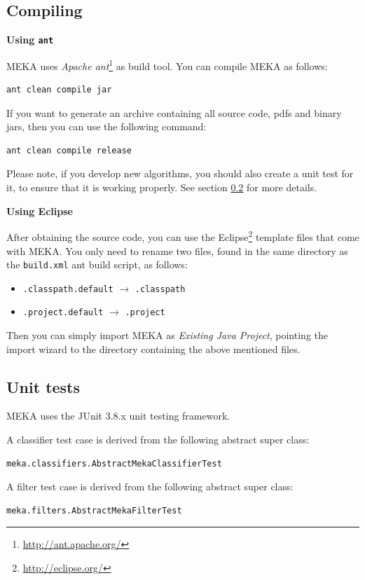 \documentclass[11pt]{article}
\newcommand{\heading}[1]{
    \vspace{0.3cm} \noindent \textbf{#1} \newline
}
\begin{document}
\subsection{Compiling}
\label{compiling}
\heading{Using \texttt{ant}}
MEKA uses \textit{Apache ant}\footnote{\url{http://ant.apache.org/}} as build tool. You can compile MEKA as follows:
\begin{lstlisting}
ant clean compile jar
\end{lstlisting}
If you want to generate an archive containing all source code, pdfs and binary jars, then you can use the following command:
\begin{lstlisting}
ant clean compile release
\end{lstlisting}
Please note, if you develop new algorithms, you should also create a unit test for it, to ensure that it is working properly. See section \ref{unittests} for more details.

\heading{Using Eclipse}
After obtaining the source code, you can use the Eclipse\footnote{\url{http://eclipse.org/}} template files that come with MEKA. You only need to rename two files, found in the same directory as the \texttt{build.xml} ant build script, as follows:
\begin{itemize}
  \item \texttt{.classpath.default} $\rightarrow$ \texttt{.classpath}
  \item \texttt{.project.default} $\rightarrow$ \texttt{.project}
\end{itemize}
Then you can simply import MEKA as \textit{Existing Java Project}, pointing the import wizard to the directory containing the above mentioned files.

\subsection{Unit tests}
\label{unittests}
MEKA uses the JUnit 3.8.x unit testing framework.

\noindent A classifier test case is derived from the following abstract super class:
\begin{lstlisting}
meka.classifiers.AbstractMekaClassifierTest
\end{lstlisting}

\noindent A filter test case is derived from the following abstract super class:
\begin{lstlisting}
meka.filters.AbstractMekaFilterTest
\end{lstlisting}
\end{document}
